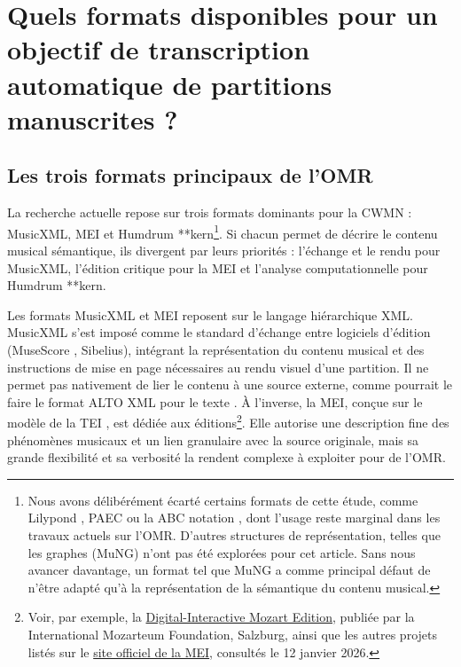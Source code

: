 \documentclass[final,fra]{anthology-ch} %
\begin{document}
\section{Quels formats disponibles pour un objectif de transcription automatique de partitions manuscrites ?}

\subsection{Les trois formats principaux de l'OMR}

La recherche actuelle repose sur trois formats dominants pour la CWMN : MusicXML, MEI et Humdrum **kern\footnote{Nous avons délibérément écarté certains formats de cette étude, comme Lilypond \cite{nienhuys_lilypond_2024}, PAEC \cite{rism_editorial_center_paec_2021} ou la ABC notation \cite{walshaw_abc_2011}, dont l'usage reste marginal dans les travaux actuels sur l'OMR. D'autres structures de représentation, telles que les graphes (MuNG) \cite{hajic_search_2017} n'ont pas été explorées pour cet article. Sans nous avancer davantage, un format tel que MuNG a comme principal défaut de n'être adapté qu'à la représentation de la sémantique du contenu musical.}. Si chacun permet de décrire le contenu musical sémantique, ils divergent par leurs priorités : l'échange et le rendu pour MusicXML, l'édition critique pour la MEI et l'analyse computationnelle pour Humdrum **kern.

Les formats MusicXML et MEI reposent sur le langage hiérarchique XML. MusicXML s'est imposé comme le standard d'échange entre logiciels d'édition (MuseScore \cite{musescore_bvba_musescore_2024}, Sibelius), intégrant la représentation du contenu musical et des instructions de mise en page nécessaires au rendu visuel d'une partition. Il ne permet pas nativement de lier le contenu à une source externe, comme pourrait le faire le format ALTO XML pour le texte \cite{alto_editorial_board_alto_2024}. À l'inverse, la MEI, conçue sur le modèle de la TEI \cite{tei_consortium_tei_2024}, est dédiée aux éditions\footnote{Voir, par exemple, la \href{https://dme.mozarteum.at/movi/}{Digital-Interactive Mozart Edition}, publiée par la International Mozarteum Foundation, Salzburg, ainsi que les autres projets listés sur le \href{https://music-encoding.org/community/projects-users.html}{site officiel de la MEI}, consultés le 12 janvier 2026.}. Elle autorise une description fine des phénomènes musicaux et un lien granulaire avec la source originale, mais sa grande flexibilité et sa verbosité la rendent complexe à exploiter pour de l'OMR.
\end{document}
